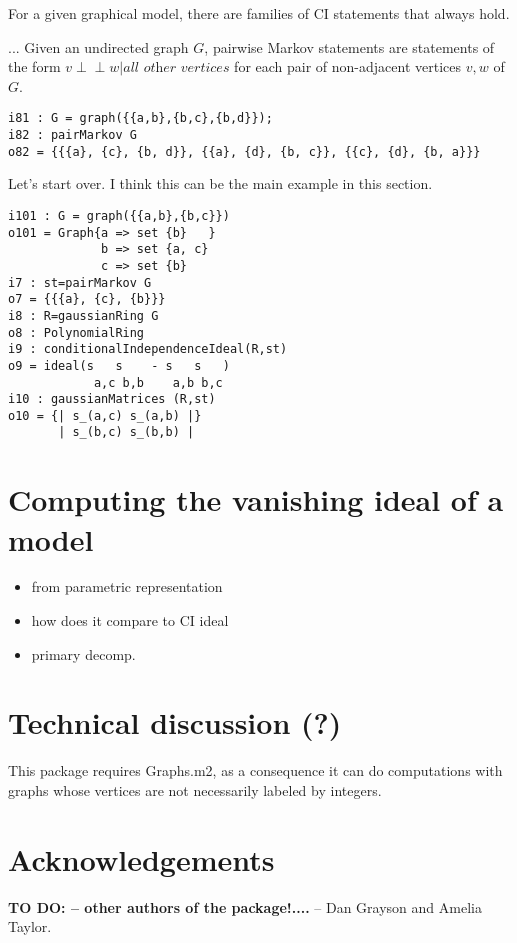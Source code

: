 \documentclass{article}
\theoremstyle{definition}
\def\ci{\perp\!\!\!\perp}
\begin{document}
For a given graphical model, there are families of CI statements that always hold. 

...
Given an undirected graph $G$, pairwise Markov statements are statements of the form $v \ci w | \textit{all other vertices}$ for each pair of non-adjacent vertices $v, w$ of $G$. 
\begin{verbatim}
i81 : G = graph({{a,b},{b,c},{b,d}}); 
i82 : pairMarkov G
o82 = {{{a}, {c}, {b, d}}, {{a}, {d}, {b, c}}, {{c}, {d}, {b, a}}}
\end{verbatim}

Let's start over. I think this can be the main example in this section. 

\begin{verbatim}
i101 : G = graph({{a,b},{b,c}})
o101 = Graph{a => set {b}   }
             b => set {a, c}
             c => set {b}
i7 : st=pairMarkov G
o7 = {{{a}, {c}, {b}}}
i8 : R=gaussianRing G
o8 : PolynomialRing
i9 : conditionalIndependenceIdeal(R,st)
o9 = ideal(s   s    - s   s   )
            a,c b,b    a,b b,c
i10 : gaussianMatrices (R,st)
o10 = {| s_(a,c) s_(a,b) |}
       | s_(b,c) s_(b,b) |
\end{verbatim}


\section{Computing the vanishing ideal of a model}

\begin{itemize}
\item from parametric representation
\item how does it compare to CI ideal
\item primary decomp.
\end{itemize}




\section{Technical discussion (?) }
This package requires Graphs.m2, as a consequence it can do
computations with graphs whose vertices are not necessarily labeled by
integers. 


\section*{Acknowledgements} {\bf TO DO: -- other authors of the package!....} -- Dan Grayson and Amelia Taylor.
\end{document}
